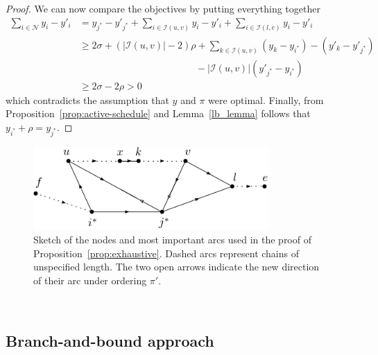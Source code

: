 \documentclass[a4paper]{article}
\theoremstyle{definition}
\theoremstyle{plain}
\begin{document}
\begin{proof}
  We can now compare the objectives by putting everything together
  \begin{align*}
    \sum_{i \in \mathcal{N}} y_{i} - y'_{i} &=  y_{j^{*}} - y'_{j^{*}} + \sum_{i \in \mathcal{I}(u, v)} y_{i} - y'_{i} + \sum_{i \in \mathcal{I}(l, e)} y_{i} - y'_{i} \\
    &\geq 2 \sigma + (|\mathcal{I}(u,v)| - 2) \rho + \sum_{k \in \mathcal{I}(u,v)} (y_{k} - y_{i^{*}}) - (y'_{k} - y'_{j^{*}}) \\ & \hspace{12em} - |\mathcal{I}(u,v)| (y'_{j^{*}} - y_{i^{*}}) \\
    &\geq 2 \sigma - 2 \rho > 0
  \end{align*}
  which contradicts the assumption that $y$ and $\pi$ were optimal.
  Finally, from Proposition~\ref{prop:active-schedule} and Lemma~\ref{lb_lemma}
  follows that $y_{i^{*}} + \rho = y_{j^{*}}$.
\end{proof}

\begin{figure}
  \centering
  \includegraphics[width=0.8\textwidth]{figures/platoon-preservation-proof-diagram.pdf}
  \caption{Sketch of the nodes and most important arcs used in the proof of
    Proposition~\ref{prop:exhaustive}. Dashed arcs represent chains of
    unspecified length. The two open arrows indicate the new direction of their
    arc under ordering $\pi'$.}\label{fig:platoon-preservation-diagram}
\end{figure}

\newpage
$\;$
\newpage
\subsection*{Branch-and-bound approach}
\end{document}

